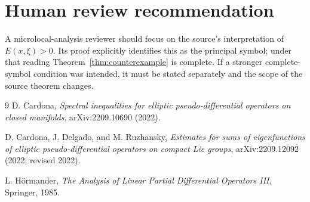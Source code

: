 \documentclass[11pt]{article}
\begin{document}
\section{Human review recommendation}

A microlocal-analysis reviewer should focus on the source's interpretation of
$E(x,\xi)>0$.  Its proof explicitly identifies this as the principal symbol;
under that reading Theorem~\ref{thm:counterexample} is complete.  If a stronger
complete-symbol condition was intended, it must be stated separately and the
scope of the source theorem changes.

\begin{thebibliography}{9}
D. Cardona,
\emph{Spectral inequalities for elliptic pseudo-differential operators on closed manifolds},
arXiv:2209.10690 (2022).

D. Cardona, J. Delgado, and M. Ruzhansky,
\emph{Estimates for sums of eigenfunctions of elliptic pseudo-differential operators on compact Lie groups},
arXiv:2209.12092 (2022; revised 2022).

L. H\"ormander,
\emph{The Analysis of Linear Partial Differential Operators III},
Springer, 1985.
\end{thebibliography}
\end{document}
